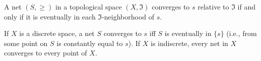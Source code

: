A net $(S, \geq)$ in a topological space $(X, \mathfrak{I})$ converges to $s$ relative to $\mathfrak{I}$ if and only if it is eventually in each $\mathfrak{I}$-neighborhood of $s$.

If $X$ is a discrete space, a net $S$ converges to $s$ iff $S$ is eventually in $\{s\}$ (i.e., from some point on $S$ is constantly equal to $s$). If $X$ is indiscrete, every net in $X$ converges to every point of $X$.
